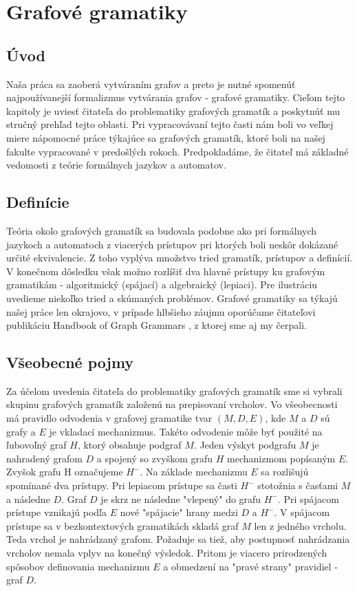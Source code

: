 
\chapter{Grafové gramatiky}%
\thispagestyle{empty}
\section{Úvod}
Naša práca sa zaoberá vytváraním grafov a preto je nutné spomenúť 
najpoužívanejší formalizmus vytvárania grafov - grafové gramatiky.
Cieľom tejto kapitoly je uviesť čitateľa do problematiky grafových 
gramatík a poskytnúť mu stručný prehľad tejto oblasti.
Pri vypracovávaní tejto časti nám boli vo veľkej miere nápomocné práce 
týkajúce sa grafových gramatík, ktoré boli na našej fakulte vypracované 
v predošlých rokoch.
Predpokladáme, že čitateľ má základné vedomosti z teórie formálnych 
jazykov a automatov.

\section{Definície}
Teória okolo grafových gramatík sa budovala podobne ako pri formálnych
jazykoch a automatoch z viacerých prístupov pri ktorých boli neskôr dokázané
určité ekvivalencie. Z toho vyplýva množstvo tried gramatík, prístupov a
definícií.
V konečnom dôsledku však možno rozlíšiť dva hlavné prístupy ku grafovým
gramatikám - algoritmický (spájací) a algebraický (lepiaci).
Pre ilustráciu uvedieme niekoľko tried a skúmaných problémov.
Grafové gramatiky sa týkajú našej práce len okrajovo, v prípade hlbšieho 
záujmu oporúčame čitateľovi publikáciu Handbook of Graph Grammars \cite{GG} ,
z ktorej sme aj my čerpali.

\section{Všeobecné pojmy}
Za účelom uvedenia čitateľa do problematiky grafových gramatík sme si
vybrali skupinu grafových gramatík založenú na prepisovaní vrcholov. Vo
všeobecnosti má pravidlo odvodenia v grafovej gramatike tvar $(M, D, E)$,
kde $M$ a $D$ sú grafy a $E$ je vkladací mechanizmus. Takéto odvodenie môže
byť použité na ľubovoľný graf $H$, ktorý obsahuje podgraf $M$. Jeden výskyt
podgrafu $M$ je nahradený grafom $D$ a spojený so zvyškom grafu $H$
mechanizmom popísaným $E$. Zvyšok grafu H označujeme $H^{-}$.
Na základe mechanizmu $E$ sa rozlišujú spomínané dva prístupy. Pri lepiacom
prístupe sa časti $H^{-}$ stotožnia s časťami $M$ a následne $D$. Graf $D$
je skrz ne následne "vlepený" do grafu $H^{-}$.
Pri spájacom prístupe vznikajú podľa $E$ nové "spájacie" hrany medzi $D$ a 
$H^{-}$.
V spájacom prístupe sa v bezkontextových gramatikách skladá graf $M$ len z
jedného vrcholu. Teda vrchol je nahrádzaný grafom. Požaduje sa tiež, aby
postupnosť nahrádzania vrcholov nemala vplyv na konečný výsledok. Pritom je
viacero prirodzených spôsobov definovania mechanizmu $E$ a obmedzení na
"pravé strany" pravidiel - graf $D$.


